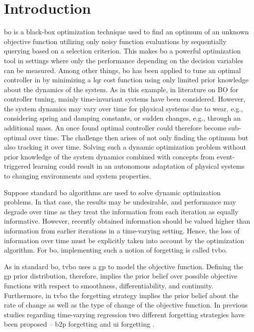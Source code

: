 \chapter{Introduction}
\label{chap:intro}

\gls{bo} is a black-box optimization technique used to find an optimum of an unknown objective function utilizing only noisy function evaluations by sequentially querying based on a selection criterion.
This makes \gls{bo} a powerful optimization tool in settings where only the performance depending on the decision variables can be measured.
Among other things, \gls{bo} has been applied to tune an optimal controller in \textcite{Marco_2016} by minimizing a \gls{lqr} cost function using only limited prior knowledge about the dynamics of the system. As in this example, in literature on BO for controller tuning, mainly time-invariant systems have been considered. However, the system dynamics may vary over time for physical systems due to wear, e.g., considering spring and damping constants, or sudden changes, e.g., through an additional mass. An once found optimal controller could therefore become sub-optimal over time.
The challenge then arises of not only finding the optimum but also tracking it over time. Solving such a dynamic optimization problem without prior knowledge of the system dynamics combined with concepts from event-triggered learning \cite{Solowjow_2020} could result in an autonomous adaptation of physical systems to changing environments and system properties.

Suppose standard \gls{bo} algorithms are used to solve dynamic optimization problems. In that case, the results may be undesirable, and performance may degrade over time as they treat the information from each iteration as equally informative.
However, recently obtained information should be valued higher than information from earlier iterations in a time-varying setting. Hence, the loss of information over time must be explicitly taken into account by the optimization algorithm. For \gls{bo}, implementing such a notion of forgetting is called \gls{tvbo}.

As in standard \gls{bo}, \gls{tvbo} uses a \gls{gp} to model the objective function. Defining the \gls{gp} prior distribution, therefore, implies the prior belief over possible objective functions with respect to smoothness, differentiability, and continuity. Furthermore, in \gls{tvbo} the forgetting strategy implies the prior belief about the rate of change as well as the type of change of the objective function. In previous studies regarding time-varying regression two different forgetting strategies have been proposed -- \gls{b2p} forgetting and \gls{ui} forgetting \cite{Vaerenbergh_2012}.

